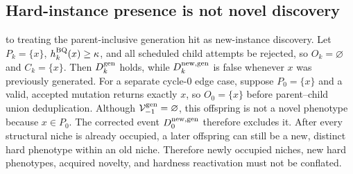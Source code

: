 \subsection{Hard-instance presence is not novel discovery}
 to treating the parent-inclusive
generation hit as new-instance discovery. Let $P_k=\{x\}$,
$h_k^{\rm BQ}(x)\geq\kappa$, and all scheduled child attempts be rejected,
so $O_k=\varnothing$ and $C_k=\{x\}$. Then $D_k^{\rm gen}$ holds, while
$D_k^{\rm new,gen}$ is false whenever $x$ was previously generated.
For a separate cycle-0 edge case, suppose $P_0=\{x\}$ and a
valid, accepted mutation returns exactly $x$, so $O_0=\{x\}$ before
parent--child union deduplication. Although
$\mathcal V_{-1}^{\rm gen}=\varnothing$, this offspring is not a novel
phenotype because $x\in P_0$. The corrected event
$D_0^{\rm new,gen}$ therefore excludes it. After every structural niche
is already occupied, a later offspring can still be a new, distinct hard
phenotype within an old niche. Therefore newly occupied niches, new hard
phenotypes, acquired novelty, and hardness reactivation must not be
conflated.
